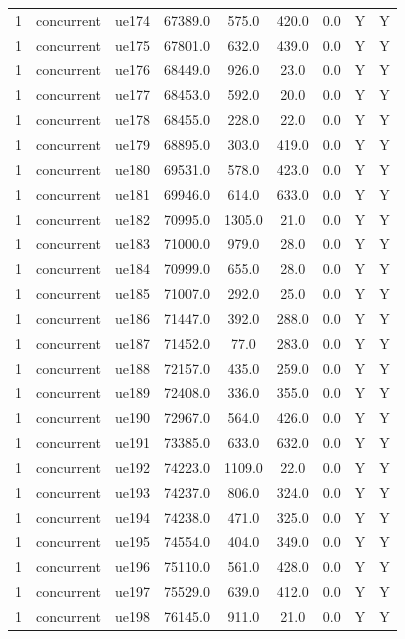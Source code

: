 \begin{table}[ht]
\begin{tabular}{|c|c|c|c|c|c|c|c|c|}
1 & concurrent & ue174 & 67389.0 & 575.0 & 420.0 & 0.0 & Y & Y \\
1 & concurrent & ue175 & 67801.0 & 632.0 & 439.0 & 0.0 & Y & Y \\
1 & concurrent & ue176 & 68449.0 & 926.0 & 23.0 & 0.0 & Y & Y \\
1 & concurrent & ue177 & 68453.0 & 592.0 & 20.0 & 0.0 & Y & Y \\
1 & concurrent & ue178 & 68455.0 & 228.0 & 22.0 & 0.0 & Y & Y \\
1 & concurrent & ue179 & 68895.0 & 303.0 & 419.0 & 0.0 & Y & Y \\
1 & concurrent & ue180 & 69531.0 & 578.0 & 423.0 & 0.0 & Y & Y \\
1 & concurrent & ue181 & 69946.0 & 614.0 & 633.0 & 0.0 & Y & Y \\
1 & concurrent & ue182 & 70995.0 & 1305.0 & 21.0 & 0.0 & Y & Y \\
1 & concurrent & ue183 & 71000.0 & 979.0 & 28.0 & 0.0 & Y & Y \\
1 & concurrent & ue184 & 70999.0 & 655.0 & 28.0 & 0.0 & Y & Y \\
1 & concurrent & ue185 & 71007.0 & 292.0 & 25.0 & 0.0 & Y & Y \\
1 & concurrent & ue186 & 71447.0 & 392.0 & 288.0 & 0.0 & Y & Y \\
1 & concurrent & ue187 & 71452.0 & 77.0 & 283.0 & 0.0 & Y & Y \\
1 & concurrent & ue188 & 72157.0 & 435.0 & 259.0 & 0.0 & Y & Y \\
1 & concurrent & ue189 & 72408.0 & 336.0 & 355.0 & 0.0 & Y & Y \\
1 & concurrent & ue190 & 72967.0 & 564.0 & 426.0 & 0.0 & Y & Y \\
1 & concurrent & ue191 & 73385.0 & 633.0 & 632.0 & 0.0 & Y & Y \\
1 & concurrent & ue192 & 74223.0 & 1109.0 & 22.0 & 0.0 & Y & Y \\
1 & concurrent & ue193 & 74237.0 & 806.0 & 324.0 & 0.0 & Y & Y \\
1 & concurrent & ue194 & 74238.0 & 471.0 & 325.0 & 0.0 & Y & Y \\
1 & concurrent & ue195 & 74554.0 & 404.0 & 349.0 & 0.0 & Y & Y \\
1 & concurrent & ue196 & 75110.0 & 561.0 & 428.0 & 0.0 & Y & Y \\
1 & concurrent & ue197 & 75529.0 & 639.0 & 412.0 & 0.0 & Y & Y \\
1 & concurrent & ue198 & 76145.0 & 911.0 & 21.0 & 0.0 & Y & Y \\

\end{tabular}
\end{table}
